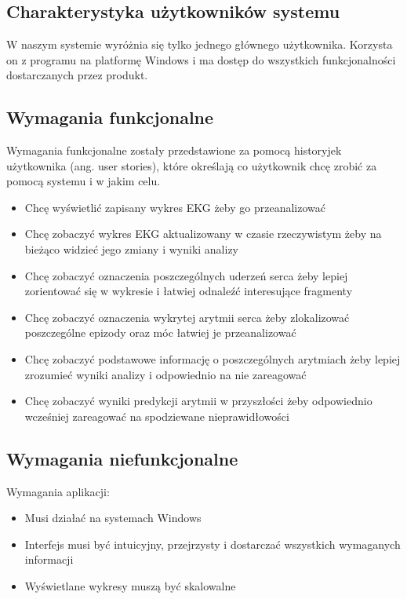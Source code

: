 \documentclass[polish,12pt]{aghthesis}
\begin{document}
\section{\SectionTitleScope}
\label{sec:zakres-funkcjonalnosci}
\subsection{Charakterystyka użytkowników systemu}

W naszym systemie wyróżnia się tylko jednego głównego użytkownika. Korzysta on z programu na platformę Windows i ma dostęp do wszystkich funkcjonalności dostarczanych przez produkt.

\subsection{Wymagania funkcjonalne}

Wymagania funkcjonalne zostały przedstawione za pomocą historyjek użytkownika (ang. user stories), które określają co użytkownik chcę zrobić za pomocą systemu i w jakim celu.

\begin{itemize}
	\item Chcę wyświetlić zapisany wykres EKG żeby go przeanalizować
	\item Chcę zobaczyć wykres EKG aktualizowany w czasie rzeczywistym żeby na bieżąco widzieć jego zmiany i wyniki analizy
	\item Chcę zobaczyć oznaczenia poszczególnych uderzeń serca żeby lepiej zorientować się w wykresie i łatwiej odnaleźć interesujące fragmenty
	\item Chcę zobaczyć oznaczenia wykrytej arytmii serca żeby zlokalizować poszczególne epizody oraz móc łatwiej je przeanalizować
	\item Chcę zobaczyć podstawowe informację o poszczególnych arytmiach żeby lepiej zrozumieć wyniki analizy i odpowiednio na nie zareagować
	\item Chcę zobaczyć wyniki predykcji arytmii w przyszłości żeby odpowiednio wcześniej zareagować na spodziewane nieprawidłowości
\end{itemize}

\subsection{Wymagania niefunkcjonalne}

Wymagania aplikacji:

\begin{itemize}
	\item Musi działać na systemach Windows
	\item Interfejs musi być intuicyjny, przejrzysty i dostarczać wszystkich wymaganych informacji
	\item Wyświetlane wykresy muszą być skalowalne
\end{itemize}
\end{document}

